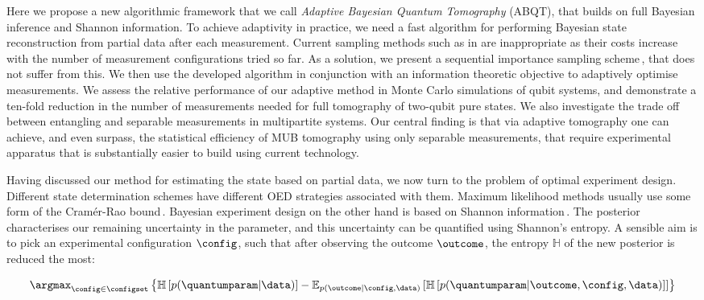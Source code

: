 Here we propose a new algorithmic framework that we call \emph{Adaptive Bayesian Quantum Tomography} (ABQT), that builds on full Bayesian inference and Shannon information. 
To achieve adaptivity in practice, we need a fast algorithm for performing Bayesian state reconstruction from partial data after each measurement. Current sampling methods such as in \citep{BayesianTomography} are inappropriate as their costs increase with the number of measurement configurations tried so far. As a solution, we present a sequential importance sampling scheme\,\citep{SMCBook}, that does not suffer from this. We then use the developed algorithm in conjunction with an information theoretic objective to adaptively optimise measurements. We assess the relative performance of our adaptive method in Monte Carlo simulations of qubit systems, and demonstrate a ten-fold reduction in the number of measurements needed for full tomography of two-qubit pure states. We also investigate the trade off between entangling and separable measurements in multipartite systems. Our central finding is that via adaptive tomography one can achieve, and even surpass, the statistical efficiency of MUB tomography using only separable measurements, that require experimental apparatus that is substantially easier to build using current technology.

Having discussed our method for estimating the state based on partial data, we now turn to the problem of optimal experiment design. Different state determination schemes have different OED strategies associated with them. Maximum likelihood methods usually use some form of the Cram\'{e}r-Rao bound\,\citep{OEDFirst,OEDAverage}. Bayesian experiment design on the other hand is based on Shannon information\,\citep{MUBFirst,ExactInformation}. The posterior characterises our remaining uncertainty in the parameter, and this uncertainty can be quantified using Shannon's entropy. A sensible aim is to pick an experimental configuration $\config$, such that after observing the outcome $\outcome$, the entropy $\mathbb{H}$ of the new posterior is reduced the most:

\begin{equation}
\argmax_{\config\in\configset} \left\{ \mathbb{H}\left[p(\quantumparam|\data)\right] - \mathbb{E}_{p(\outcome\vert\config,\data)}\left[\mathbb{H}\left[ p(\quantumparam|\outcome,\config,\data) \right] \right]\right\}\label{eqn:expectedentropyreduction}
\end{equation} 


